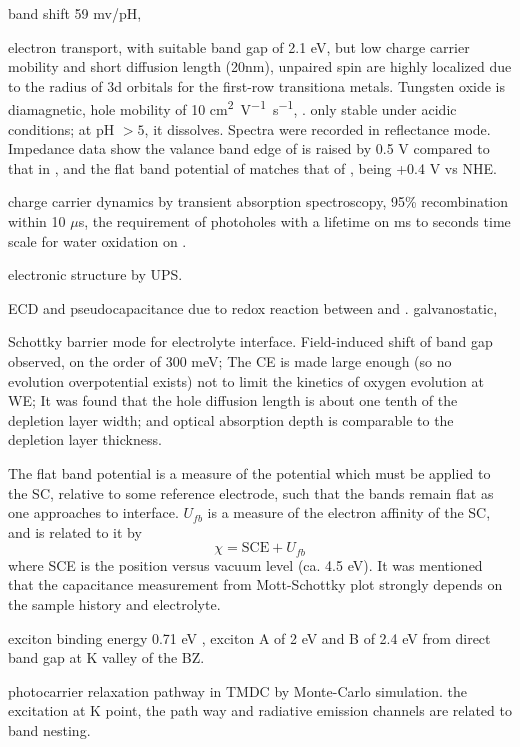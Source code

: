 band shift 59 mv/pH, 

electron transport,  with suitable band gap of 2.1 eV, but low charge carrier mobility and short diffusion length (20nm), unpaired spin are highly localized due to the radius of 3d orbitals for the first-row transitiona metals.\cite{Yourey2011} Tungsten oxide is diamagnetic, hole mobility of 10 \si{cm^2V^{-1}s^{-1}}, \cite{Butler1977}.  only stable under acidic conditions; at pH $>5$, it dissolves. Spectra were recorded in reflectance mode. Impedance data show the valance band edge of  is raised by 0.5 V compared to that in , and the flat band potential of  matches that of , being +0.4 V vs NHE. 


 charge carrier dynamics by transient absorption spectroscopy, 95\% recombination within 10 $\mu$s, the requirement of photoholes with a lifetime on ms to seconds time scale for water oxidation on .   \cite{Pesci2011}

 electronic structure by UPS. \cite{Hochst1982}

 ECD and pseudocapacitance due to redox reaction between  and .\cite{Yang2014} galvanostatic, 

Schottky barrier mode for  electrolyte interface.\cite{Butler1977} Field-induced shift of band gap observed, on the order of 300 meV; The CE is made large enough (so no  evolution overpotential exists) not to limit the kinetics of oxygen evolution at WE; It was found that the hole diffusion length is about one tenth of the depletion layer width; and optical absorption depth is comparable to the depletion layer thickness. 

The flat band potential is a measure of the potential which must be applied to the SC, relative to some reference electrode, such that the bands remain flat as one approaches to interface. $U_{fb}$ is a measure of the electron affinity of the SC, and is related to it by 
\[
\chi = \text{SCE} + U_{fb}
\]
where SCE is the position versus vacuum level (ca. 4.5 eV). It was mentioned that the capacitance measurement from Mott-Schottky plot strongly depends on the sample history and electrolyte. 

 exciton binding energy 0.71 eV , exciton A of 2 eV and B of 2.4 eV from direct band gap at K valley of the BZ. \cite{Zhu2014a}

photocarrier relaxation pathway in TMDC by Monte-Carlo simulation.\cite{Kozawa2014} the excitation at K point, the path way and radiative emission channels are related to band nesting. 

